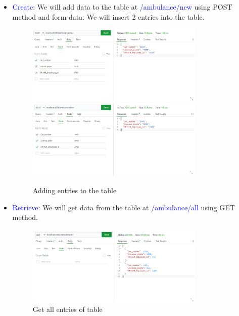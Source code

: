 \documentclass[a4paper]{article}
\numberwithin{equation}{section}
\begin{document}
\begin{itemize}
  \item \textcolor{blue}{Create}:
        We will add data to the table at \textcolor{blue}{/ambulance/new} using POST method and form-data.
        We will insert 2 entries into the table.
        \begin{figure}[H]
          \centering
          \includegraphics[width=0.8\textwidth]{./assets/api_new1.png}
          \includegraphics[width=0.8\textwidth]{./assets/api_new2.png}
          \caption{Adding entries to the table}
        \end{figure}

  \item \textcolor{blue}{Retrieve}:
        We will get data from the table at \textcolor{blue}{/ambulance/all} using GET method.
        \begin{figure}[H]
          \centering
          \includegraphics[width=0.8\textwidth]{./assets/api_all.png}
          \caption{Get all entries of table}
        \end{figure}


\end{itemize}
\end{document}
